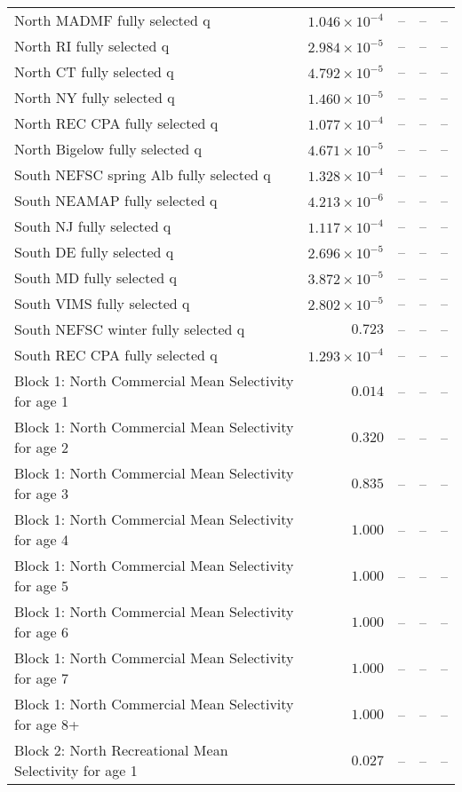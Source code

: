\documentclass[
]{article}
\begin{document}
\begin{landscape}
\begin{longtable}[t]{lrrrr}
North MADMF fully selected q & $1.046\times 10^{-4}$ & -- & -- & --\\
North RI fully selected q & $2.984\times 10^{-5}$ & -- & -- & --\\
North CT fully selected q & $4.792\times 10^{-5}$ & -- & -- & --\\
\addlinespace
North NY fully selected q & $1.460\times 10^{-5}$ & -- & -- & --\\
North REC CPA fully selected q & $1.077\times 10^{-4}$ & -- & -- & --\\
North Bigelow fully selected q & $4.671\times 10^{-5}$ & -- & -- & --\\
South NEFSC spring Alb fully selected q & $1.328\times 10^{-4}$ & -- & -- & --\\
South NEAMAP fully selected q & $4.213\times 10^{-6}$ & -- & -- & --\\
\addlinespace
South NJ fully selected q & $1.117\times 10^{-4}$ & -- & -- & --\\
South DE fully selected q & $2.696\times 10^{-5}$ & -- & -- & --\\
South MD fully selected q & $3.872\times 10^{-5}$ & -- & -- & --\\
South VIMS fully selected q & $2.802\times 10^{-5}$ & -- & -- & --\\
South NEFSC winter fully selected q & $0.723$ & -- & -- & --\\
\addlinespace
South REC CPA fully selected q & $1.293\times 10^{-4}$ & -- & -- & --\\
Block 1: North Commercial Mean Selectivity for age 1 & $0.014$ & -- & -- & --\\
Block 1: North Commercial Mean Selectivity for age 2 & $0.320$ & -- & -- & --\\
Block 1: North Commercial Mean Selectivity for age 3 & $0.835$ & -- & -- & --\\
Block 1: North Commercial Mean Selectivity for age 4 & $1.000$ & -- & -- & --\\
\addlinespace
Block 1: North Commercial Mean Selectivity for age 5 & $1.000$ & -- & -- & --\\
Block 1: North Commercial Mean Selectivity for age 6 & $1.000$ & -- & -- & --\\
Block 1: North Commercial Mean Selectivity for age 7 & $1.000$ & -- & -- & --\\
Block 1: North Commercial Mean Selectivity for age 8+ & $1.000$ & -- & -- & --\\
Block 2: North Recreational Mean Selectivity for age 1 & $0.027$ & -- & -- & --\\

\end{longtable}
\end{landscape}
\end{document}

